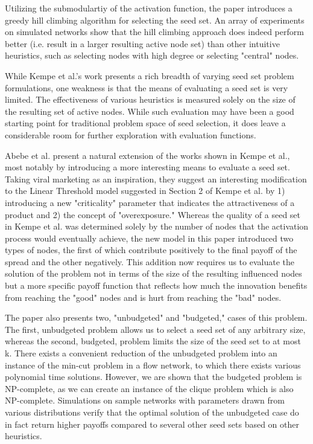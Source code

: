 \documentclass{article}
\begin{document}
Utilizing the submodulartiy of the activation function, the paper introduces a greedy hill climbing algorithm for selecting the seed set. An array of experiments on simulated networks show that the hill climbing approach does indeed perform better (i.e. result in a larger resulting active node set) than other intuitive heuristics, such as selecting nodes with high degree or selecting "central" nodes.

While Kempe et al.'s  work presents a rich breadth of varying seed set problem formulations, one weakness is that the means of evaluating a seed set is very limited. The effectiveness of various heuristics is measured solely on the size of the resulting set of active nodes. While such evaluation may have been a good starting point for traditional problem space of seed selection, it does leave a considerable room for further exploration with evaluation functions. 

Abebe et al. present a natural extension of the works shown in Kempe et al., most notably by introducing a more interesting means to evaluate a seed set. Taking viral marketing as an inspiration, they suggest an interesting modification to the Linear Threshold model suggested in Section 2 of Kempe et al. by 1) introducing a new "criticality" parameter that indicates the attractiveness of a product and 2) the concept of "overexposure." Whereas the quality of a seed set in Kempe et al. was determined solely by the number of nodes that the activation process would eventually achieve, the new model in this paper introduced two types of nodes, the first of which contribute positively to the final payoff of the spread and the other negatively. This addition now requires us to evaluate the solution of the problem not in terms of the size of the resulting influenced nodes but a more specific payoff function that reflects how much the innovation benefits from reaching the "good" nodes and is hurt from reaching the "bad" nodes.

The paper also presents two, "unbudgeted" and "budgeted," cases of this problem. The first, unbudgeted problem allows us to select a seed set of any arbitrary size, whereas the second, budgeted, problem limits the size of the seed set to at most k. There exists a convenient reduction of the unbudgeted problem into an instance of the min-cut problem in a flow network, to which there exists various polynomial time solutions. However, we are shown that the budgeted problem is NP-complete, as we can create an instance of the clique problem which is also NP-complete. Simulations on sample networks with parameters drawn from various distributions verify that the optimal solution of the unbudgeted case do in fact return higher payoffs compared to several other seed sets based on other heuristics.
\end{document}
